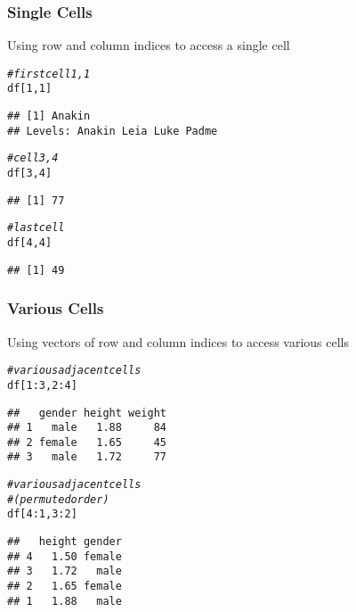 \documentclass[12pt]{beamer}\usepackage[]{graphicx}\usepackage[]{color}
\makeatletter
\newcommand{\hlnum}[1]{\textcolor[rgb]{0.686,0.059,0.569}{#1}}%
\newcommand{\hlcom}[1]{\textcolor[rgb]{0.678,0.584,0.686}{\textit{#1}}}%
\newcommand{\hlopt}[1]{\textcolor[rgb]{0,0,0}{#1}}%
\newcommand{\hlstd}[1]{\textcolor[rgb]{0.345,0.345,0.345}{#1}}%
\newenvironment{kframe}{%
 \def\at@end@of@kframe{}%
 \ifinner\ifhmode%
  \def\at@end@of@kframe{\end{minipage}}%
  \begin{minipage}{\columnwidth}%
 \fi\fi%
 \def\FrameCommand##1{\hskip\@totalleftmargin \hskip-\fboxsep
 \colorbox{shadecolor}{##1}\hskip-\fboxsep
     \hskip-\linewidth \hskip-\@totalleftmargin \hskip\columnwidth}%
 \MakeFramed {\advance\hsize-\width
   \@totalleftmargin\z@ \linewidth\hsize
   \@setminipage}}%
 {\par\unskip\endMakeFramed%
 \at@end@of@kframe}
\newenvironment{knitrout}{}{} %
\makeatother
\begin{document}
\begin{frame}[fragile]
\frametitle{Single Cells}

Using row and column indices to access a single cell
\begin{knitrout}\footnotesize
{}\color{fgcolor}\begin{kframe}
\begin{alltt}
\hlcom{# first cell 1,1}
\hlstd{df[}\hlnum{1}\hlstd{,} \hlnum{1}\hlstd{]}
\end{alltt}
\begin{verbatim}
## [1] Anakin
## Levels: Anakin Leia Luke Padme
\end{verbatim}
\begin{alltt}
\hlcom{# cell 3,4 }
\hlstd{df[}\hlnum{3}\hlstd{,} \hlnum{4}\hlstd{]}
\end{alltt}
\begin{verbatim}
## [1] 77
\end{verbatim}
\begin{alltt}
\hlcom{# last cell}
\hlstd{df[}\hlnum{4}\hlstd{,} \hlnum{4}\hlstd{]}
\end{alltt}
\begin{verbatim}
## [1] 49
\end{verbatim}
\end{kframe}
\end{knitrout}

\end{frame}


\begin{frame}[fragile]
\frametitle{Various Cells}

Using vectors of row and column indices to access various cells
\begin{knitrout}\footnotesize
{}\color{fgcolor}\begin{kframe}
\begin{alltt}
\hlcom{# various adjacent cells}
\hlstd{df[}\hlnum{1}\hlopt{:}\hlnum{3}\hlstd{,} \hlnum{2}\hlopt{:}\hlnum{4}\hlstd{]}
\end{alltt}
\begin{verbatim}
##   gender height weight
## 1   male   1.88     84
## 2 female   1.65     45
## 3   male   1.72     77
\end{verbatim}
\begin{alltt}
\hlcom{# various adjacent cells}
\hlcom{# (permuted order)}
\hlstd{df[}\hlnum{4}\hlopt{:}\hlnum{1}\hlstd{,} \hlnum{3}\hlopt{:}\hlnum{2}\hlstd{]}
\end{alltt}
\begin{verbatim}
##   height gender
## 4   1.50 female
## 3   1.72   male
## 2   1.65 female
## 1   1.88   male
\end{verbatim}
\end{kframe}
\end{knitrout}

\end{frame}
\end{document}
